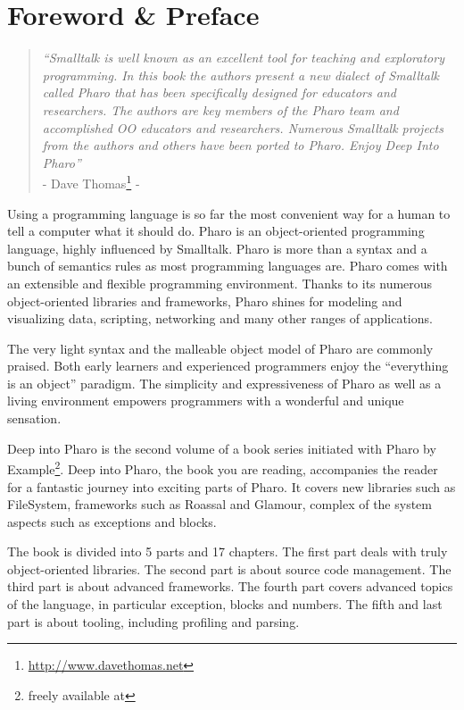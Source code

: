 \documentclass[a4paper,10pt,twoside]{book}
\begin{document}
	\sloppy
	\frontmatter
\fi
\chapter{Foreword \& Preface}

\begin{quote}
\emph{``Smalltalk is well known as an excellent tool for teaching and exploratory programming.  In this book the authors present a new dialect of Smalltalk called Pharo that has been specifically designed for educators and researchers.  The authors are key members of the Pharo team and accomplished OO educators and researchers.   Numerous Smalltalk projects from the authors and others have been ported to Pharo.  Enjoy Deep Into Pharo''} \\ - Dave Thomas\footnote{\url{http://www.davethomas.net}} -
\end{quote}

Using a programming language is so far the most convenient way for a human to tell  a computer what it should do. Pharo is an object-oriented programming language, highly influenced by Smalltalk. Pharo is more than a syntax and a bunch of semantics rules as most programming languages are. Pharo comes with an extensible and flexible programming environment. Thanks to its numerous object-oriented libraries and frameworks, Pharo shines for modeling and visualizing data, scripting, networking and many other ranges of applications.

The very light syntax and the malleable object model of Pharo are commonly praised. Both early learners and experienced programmers enjoy the ``everything is an object'' paradigm. The simplicity and expressiveness of Pharo as well as a living environment empowers programmers with a wonderful and unique sensation. 

Deep into Pharo is the second volume of a book series initiated with Pharo by Example\footnote{freely available at }. 
Deep into Pharo, the book you are reading, accompanies the reader for a fantastic journey into exciting parts of Pharo. It covers new libraries such as FileSystem, frameworks such as Roassal and Glamour, complex of the system aspects such as exceptions and blocks. 

The book is divided into 5 parts and 17 chapters. The first part deals with truly object-oriented libraries. The second part is about source code management. The third part is about advanced frameworks. The fourth part covers advanced topics of the language, in particular exception, blocks and numbers. The fifth and last part is about tooling, including profiling and parsing.
\end{document}
